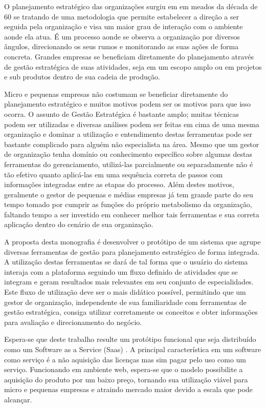 \documentclass{abnt}
\begin{document}
O planejamento estratégico das organizações surgiu em em meados da década de 60
se tratando de uma metodologia que permite estabelecer a direção a ser seguida
pela organização e visa um maior grau de interação com o ambiente aonde ela
atua. É um processo aonde se observa a organização por diversos ângulos,
direcionando os seus rumos e monitorando as suas ações de forma concreta.
Grandes empresas se beneficiam diretamente do planejamento através de gestão
estratégica de suas atividades, seja em um escopo amplo ou em projetos e sub
produtos dentro de sua cadeia de produção.

Micro e pequenas empresas não costumam se beneficiar diretamente do planejamento
estratégico e muitos motivos podem ser os motivos para que isso ocorra. O
assunto de Gestão Estratégica é bastante amplo; muitas técnicas podem ser
utilizadas e diversas análises podem ser feitas em cima de uma mesma organização
e dominar a utilização e entendimento destas ferramentas pode ser bastante
complicado para alguém não especialista na área. Mesmo que um gestor de
organização tenha domínio ou conhecimento específico sobre algumas destas
ferramentas do gerenciamento, utilizá-las parcialmente ou separadamente não é
tão efetivo quanto aplicá-las em uma sequência correta de passos com informações
integradas entre as etapas do processo. Além destes motivos, geralmente o gestor
de pequenas e médias empresas já tem grande parte do seu tempo tomado por
cumprir as funções do próprio metabolismo da organização, faltando tempo a ser
investido em conhecer melhor tais ferramentas e sua correta aplicação dentro do
cenário de sua organização.

A proposta desta monografia é desenvolver o protótipo de um sistema que agrupe
diversas ferramentas de gestão para planejamento estratégico de forma integrada.
A utilização destas ferramentas se dará de tal forma que o usuário do sistema
interaja com a plataforma seguindo um fluxo definido de atividades que se
integram e geram resultados mais relevantes em seu conjunto de especialidades.
Este fluxo de utilização deve ser o mais didático possível, permitindo que um
gestor de organização, independente de sua familiaridade com ferramentas de
gestão estratégica, consiga utilizar corretamente os conceitos e obter
informações para avaliação e direcionamento do negócio.

Espera-se que deste trabalho resulte um protótipo funcional que seja distribuído
como um Software as a Service (Saas) \cite{Turner2003}. A principal
característica em um software como serviço é a não aquisição das licenças mas
sim pagar pelo uso como um serviço. Funcionando em ambiente web, espera-se que
o modelo possibilite a aquisição do produto por um baixo preço, tornando sua
utilização viável para micro e pequenas empresas e atraindo mercado maior devido
a escala que pode alcançar.
\end{document}
